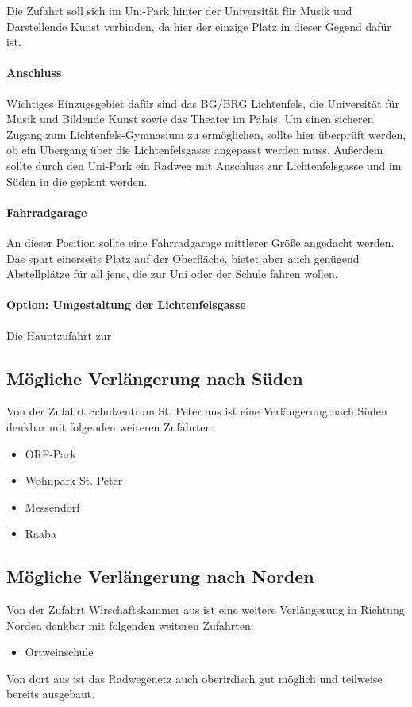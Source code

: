 Die Zufahrt soll sich im Uni-Park hinter der Universität für Musik und Darstellende Kunst verbinden, da hier der einzige Platz in dieser Gegend dafür ist.

\paragraph{Anschluss}
Wichtiges Einzugsgebiet dafür sind das BG/BRG Lichtenfels, die Universität für Musik und Bildende Kunst sowie das Theater im Palais. Um einen sicheren Zugang zum Lichtenfels-Gymnasium zu ermöglichen, sollte hier überprüft werden, ob ein Übergang über die Lichtenfelsgasse angepasst werden muss. Außerdem sollte durch den Uni-Park ein Radweg mit Anschluss zur Lichtenfelsgasse und im Süden in die  geplant werden.

\paragraph{Fahrradgarage}
An dieser Position sollte eine Fahrradgarage mittlerer Größe angedacht werden. Das spart einerseits Platz auf der Oberfläche, bietet aber auch genügend Abstellplätze für all jene, die zur Uni oder der Schule fahren wollen.

\paragraph{Option: Umgestaltung der Lichtenfelsgasse}
Die Hauptzufahrt zur 

\subsection{Mögliche Verlängerung nach Süden}
Von der Zufahrt Schulzentrum St. Peter aus ist eine Verlängerung nach Süden denkbar mit folgenden weiteren Zufahrten:
\begin{itemize}
    \item ORF-Park
    \item Wohnpark St. Peter
    \item Messendorf
    \item Raaba
\end{itemize}

\subsection{Mögliche Verlängerung nach Norden}
Von der Zufahrt Wirschaftskammer aus ist eine weitere Verlängerung in Richtung Norden denkbar mit folgenden weiteren Zufahrten:
\begin{itemize}
    \item Ortweinschule
\end{itemize}

Von dort aus ist das Radwegenetz auch oberirdisch gut möglich und teilweise bereits ausgebaut.